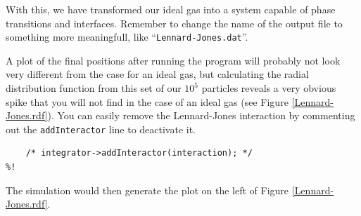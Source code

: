 With this, we have transformed our ideal gas into a system capable of phase
transitions and interfaces. Remember to change the name of the output file to
something more meaningfull, like ``\texttt{Lennard-Jones.dat}''.

A plot of the final positions after running the program will probably not look
very different from the case for an ideal gas, but calculating the radial
distribution function from this set of our $10^5$ particles reveals a very
obvious spike that you will not find in the case of an ideal gas (see Figure
\ref{Lennard-Jones.rdf}). You can easily remove the Lennard-Jones interaction by
commenting out the \texttt{addInteractor} line to deactivate it.
\begin{lstlisting}
    /* integrator->addInteractor(interaction); */
%!
\end{lstlisting}
The simulation would then generate the plot on the left of Figure
\ref{Lennard-Jones.rdf}.

